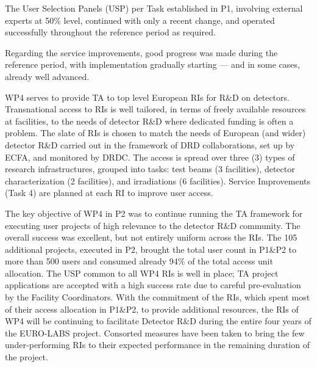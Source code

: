 The User Selection Panels (USP) per Task established in P1, involving external experts at 50\% level,  continued with only a recent change, and operated successfully throughout the reference period as required. 

Regarding the service improvements, good progress was made during the reference period, with implementation gradually starting — and in some cases, already well advanced.



WP4 serves to provide TA to top level European RIs for R\&D on detectors. Transnational access to RIs is well tailored, in terms of freely available resources at facilities, to the needs of detector R\&D where dedicated funding is often a problem. The slate of RIs is chosen to match the needs of European (and wider) detector R\&D carried out in the framework of DRD collaborations, set up by ECFA, and monitored by DRDC. The access is spread over three (3) types of research infrastructures, grouped into tasks: test beams (3 facilities), detector characterization (2 facilities), and irradiations (6 facilities). Service Improvements (Task 4) are planned at each RI to improve user access.

The key objective of WP4 in P2 was to continue running the TA framework for executing user projects of high relevance to the detector R\&D community. The overall success was excellent, but not entirely uniform across the RIs. The 105 additional projects, executed in P2, brought the total user count in P1\&P2 to more than 500 users and consumed already 94\% of the total access unit allocation. The USP common to all WP4 RIs is well in place; TA project applications are accepted with a high success rate due to careful pre-evaluation by the Facility Coordinators. With the commitment of the RIs, which spent most of their access allocation in P1\&P2, to provide additional resources, the RIs of WP4 will be continuing to facilitate Detector R\&D during the entire four years of the EURO-LABS project. Consorted measures have been taken to bring the few under-performing RIs to their expected performance in the remaining duration of the project.





